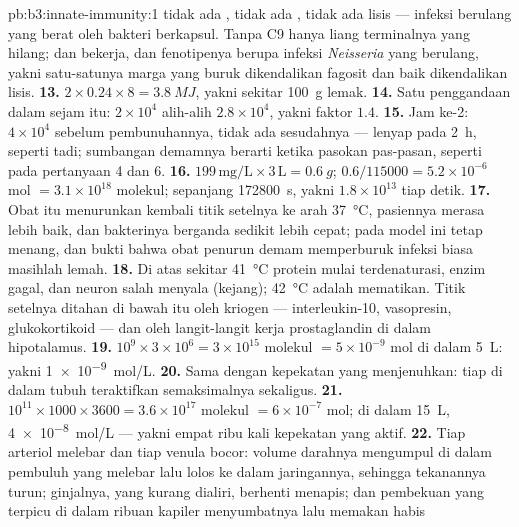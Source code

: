 \begin{solution}{pb:b3:innate-immunity:1}
tidak ada , tidak ada , tidak ada lisis --- infeksi berulang
yang berat oleh bakteri berkapsul. Tanpa C9 hanya liang terminalnya
yang hilang;  dan  bekerja, dan fenotipenya berupa
infeksi \emph{Neisseria} yang berulang, yakni satu-satunya marga yang buruk
dikendalikan fagosit dan baik dikendalikan lisis.
\textbf{13.} $2\times 0.24\times 8 = \qty{3.8}{MJ}$, yakni sekitar \qty{100}{g}
lemak.
\textbf{14.} Satu penggandaan dalam sejam itu: $2\times 10^{4}$ alih-alih
$2.8\times 10^{4}$, yakni faktor $1.4$.
\textbf{15.} Jam ke-2: $4\times 10^{4}$ sebelum pembunuhannya, tidak ada sesudahnya --- lenyap
pada \qty{2}{h}, seperti tadi; sumbangan demamnya berarti ketika
pasokan  pas-pasan, seperti pada pertanyaan 4 dan 6.
\textbf{16.} $199\,\text{mg/L}\times 3\,\text{L} = \qty{0.6}{g}$; $0.6/
\num{115000} = 5.2\times 10^{-6}$ mol $= 3.1\times 10^{18}$ molekul;
sepanjang \qty{172800}{s}, yakni $1.8\times 10^{13}$ tiap detik.
\textbf{17.} Obat itu menurunkan kembali titik setelnya ke arah \qty{37}{\celsius},
pasiennya merasa lebih baik, dan bakterinya berganda sedikit lebih cepat; pada
model ini  tetap menang, dan bukti bahwa obat penurun demam
memperburuk infeksi biasa masihlah lemah.
\textbf{18.} Di atas sekitar \qty{41}{\celsius} protein mulai terdenaturasi,
enzim gagal, dan neuron salah menyala (kejang); \qty{42}{\celsius} adalah
mematikan. Titik setelnya ditahan di bawah itu oleh kriogen --- interleukin-10,
vasopresin, glukokortikoid --- dan oleh langit-langit kerja prostaglandin
di dalam hipotalamus.
\textbf{19.} $10^{9}\times 3\times 10^{6} = 3\times 10^{15}$ molekul
$= 5\times 10^{-9}$ mol di dalam \qty{5}{L}: yakni \qty{1e-9}{mol/L}.
\textbf{20.} Sama dengan kepekatan yang menjenuhkan: tiap  di
dalam tubuh teraktifkan semaksimalnya sekaligus.
\textbf{21.} $10^{11}\times 1000\times 3600 = 3.6\times 10^{17}$ molekul
$= 6\times 10^{-7}$ mol; di dalam \qty{15}{L}, \qty{4e-8}{mol/L} --- yakni empat
ribu kali kepekatan yang aktif.
\textbf{22.} Tiap arteriol melebar dan tiap venula bocor: volume darahnya
mengumpul di dalam pembuluh yang melebar lalu lolos ke dalam jaringannya, sehingga
tekanannya turun; ginjalnya, yang kurang dialiri, berhenti menapis; dan
pembekuan yang terpicu di dalam ribuan kapiler menyumbatnya lalu memakan habis

\end{solution}

